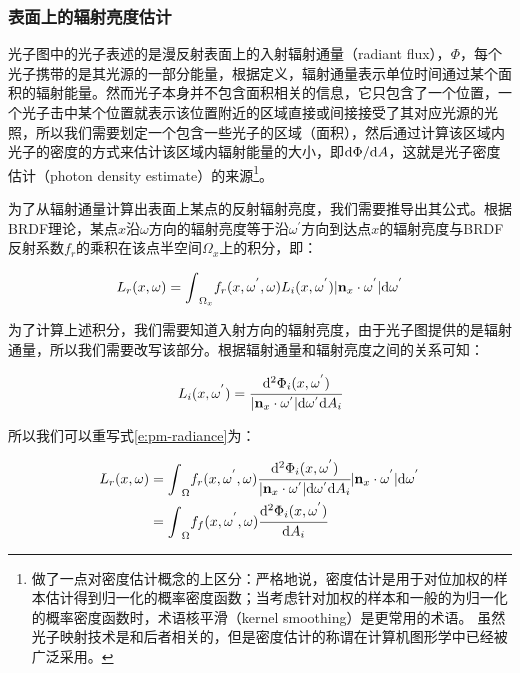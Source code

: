\subsubsection{表面上的辐射亮度估计}\label{sec:pm-radiance-estimate-at-a-surface}
光子图中的光子表述的是漫反射表面上的入射辐射通量（radiant flux），$\Phi$，每个光子携带的是其光源的一部分能量，根据定义，辐射通量表示单位时间通过某个面积的辐射能量。然而光子本身并不包含面积相关的信息，它只包含了一个位置，一个光子击中某个位置就表示该位置附近的区域直接或间接接受了其对应光源的光照，所以我们需要划定一个包含一些光子的区域（面积），然后通过计算该区域内光子的密度的方式来估计该区域内辐射能量的大小，即${\rm d}\Phi /{\rm d}A$，这就是光子密度估计（photon density estimate）的来源\footnote{\cite{b:pbrt}做了一点对密度估计概念的上区分：严格地说，密度估计是用于对位加权的样本估计得到归一化的概率密度函数；当考虑针对加权的样本和一般的为归一化的概率密度函数时，术语核平滑（kernel smoothing）是更常用的术语。 虽然光子映射技术是和后者相关的，但是密度估计的称谓在计算机图形学中已经被广泛采用。}。

为了从辐射通量计算出表面上某点的反射辐射亮度，我们需要推导出其公式。根据BRDF理论，某点$x$沿${\omega}$方向的辐射亮度等于沿${\omega}^{'}$方向到达点$x$的辐射亮度与BRDF反射系数$f_r$的乘积在该点半空间$\Omega_x$上的积分，即：

\begin{equation}\label{e:pm-radiance}
	L_r(x,{\omega})={\rm \int}_{\Omega_x} f_r(x,{\omega}^{'},{\omega})L_i(x,{\omega}^{'})|\mathbf{n}_x\cdot{\omega}^{'}|{\rm d}{\omega}^{'}
\end{equation}

为了计算上述积分，我们需要知道入射方向的辐射亮度，由于光子图提供的是辐射通量，所以我们需要改写该部分。根据辐射通量和辐射亮度之间的关系可知：

\begin{equation}
	L_i(x,{\omega}^{'})= \cfrac{{\rm d}^{2}\Phi_i(x,{\omega}^{'})}{|\mathbf{n}_x\cdot{\omega}^{'}|{\rm d}{\omega}^{'} {\rm d}A_i}	
\end{equation}

\noindent 所以我们可以重写式\ref{e:pm-radiance}为：

\begin{equation}
\begin{aligned}
	L_r(x,{\omega})&={\rm \int}_\Omega f_r(x,{\omega}^{'},{\omega})  \cfrac{{\rm d}^{2}\Phi_i(x,{\omega}^{'})}{|\mathbf{n}_x\cdot{\omega}^{'}|{\rm d}{\omega}^{'} {\rm d}A_i}    |\mathbf{n}_x\cdot{\omega}^{'}|{\rm d}\omega^{'}\\
	&={\rm \int}_\Omega f_f(x,{\omega}^{'},{\omega})  \cfrac{{\rm d}^{2}\Phi_i(x,{\omega}^{'})}{{\rm d}A_i} 
\end{aligned}
\end{equation}

